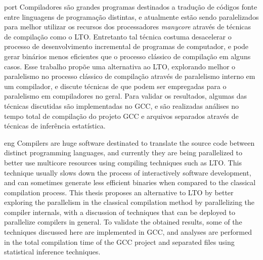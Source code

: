 \begin{resumo}{port}
    Compiladores são grandes programas destinados a tradução de
    códigos fonte entre linguagens de programação distintas, e 
    atualmente estão sendo 
    paralelizados para melhor utilizar os recursos dos processadores
    \textit{manycore} através de técnicas de compilação como o LTO.
    Entretanto tal técnica costuma desacelerar o processo de desenvolvimento
    incremental de programas de computador, e pode gerar binários menos eficientes 
    que o processo
    clássico de compilação em alguns casos. Esse trabalho propõe uma
    alternativa ao LTO, explorando melhor o paralelismo no
    processo clássico de compilação através de paralelismo interno em um compilador,
    e discute técnicas de que podem
    ser empregadas para o paralelismo em compiladores no geral. 
    Para validar os resultados, algumas das técnicas discutidas são implementadas no 
    GCC, e são realizadas análises no tempo total de compilação do projeto GCC
    e arquivos separados através de técnicas de inferência estatística.
\end{resumo}

\begin{resumo}{eng}
Compilers are huge software destinated to translate the source code between
distinct programming languages, and currently they are being parallelized to better
use multicore resources using compiling techniques such as LTO. This technique
usually slows down the process of interactively software development, and can
sometimes generate less efficient binaries when compared to the classical
compilation process. This thesis proposes an alternative to LTO by
better exploring the parallelism in the classical compilation method by
parallelizing the compiler internals, with a discussion of techniques that can
be deployed to parallelize compilers in general. To validate the obtained
results, some of the techniques discussed here are implemented in GCC, and
analyses are performed in the total compilation time of the GCC project and
separated files using statistical inference techniques.
\end{resumo}
